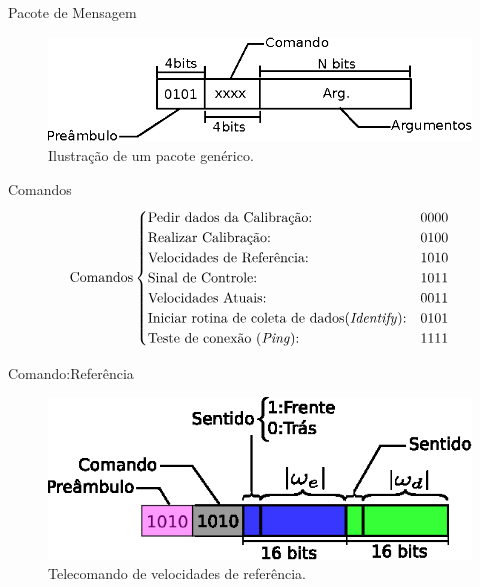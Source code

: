\begin{frame}{Pacote de Mensagem}
    \begin{figure}
        \centering
        \includegraphics[width=1.0\textwidth]{figuras/ilustracoes/ilustracao_frame_generico.eps}
        \caption{Ilustração de um pacote genérico.}
    \end{figure}
\end{frame}

\begin{frame}{Comandos}
    \begin{align*}
    \text{Comandos}
        \begin{cases}
            \text{Pedir dados da Calibração:} & 0000\\
            \text{Realizar Calibração:} & 0100\\
            \text{Velocidades de Referência:} & 1010\\
            \text{Sinal de Controle:} & 1011\\
            \text{Velocidades Atuais:} & 0011\\
            \text{Iniciar rotina de coleta de dados(\emph{Identify}):} & 0101\\
            \text{Teste de conexão (\emph{Ping}):} & 1111
        \end{cases}
    \end{align*}
\end{frame}

\begin{frame}{Comando:Referência}
    \begin{figure}
        \centering
        \includegraphics[width=\textwidth]{figuras/ilustracoes/ilustracao_comando_omega_ref.eps}
        \caption{Telecomando de velocidades de referência.}
    \end{figure}
\end{frame}


